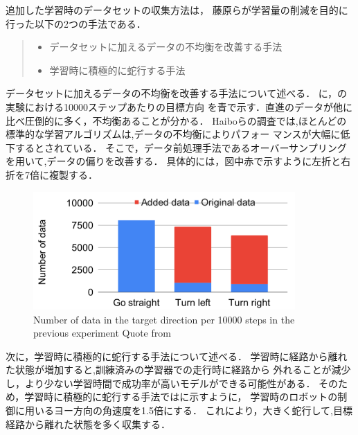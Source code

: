 追加した学習時のデータセットの収集方法は，
藤原ら\cite{fujiwara2023}が学習量の削減を目的に行った以下の2つの手法である．
\begin{quote}
    \begin{itemize}
     \item データセットに加えるデータの不均衡を改善する手法
     \item 学習時に積極的に蛇行する手法
    \end{itemize}
   \end{quote}


データセットに加えるデータの不均衡を改善する手法について述べる．
に，の実験における10000ステップあたりの目標方向
を青で示す．直進のデータが他に比べ圧倒的に多く，不均衡あることが分かる．
Haiboらの調査\cite{hukinko}では,ほとんどの標準的な学習アルゴリズムは,データの不均衡によりパフォー
マンスが大幅に低下するとされている．
そこで，データ前処理手法であるオーバーサンプリングを用いて,データの偏りを改善する．
具体的には，図中赤で示すように左折と右折を7倍に複製する．
\vspace{3zh}
\begin{figure}[htbp]
    \centering
     \includegraphics[width=100mm]{images/pdf/oversmple.pdf}
     \caption{Number of data in the target direction per 10000 steps
     in the previous experiment Quote from \cite{fujiwara2023}}\label{fig:oversmple}
\end{figure}
\clearpage
次に，学習時に積極的に蛇行する手法について述べる．
学習時に経路から離れた状態が増加すると,訓練済みの学習器での走行時に経路から
外れることが減少し，より少ない学習時間で成功率が高いモデルができる可能性がある．
そのため，学習時に積極的に蛇行する手法ではに示すように，
学習時のロボットの制御に用いるヨー方向の角速度を1.5倍にする．
これにより，大きく蛇行して,目標経路から離れた状態を多く収集する．


